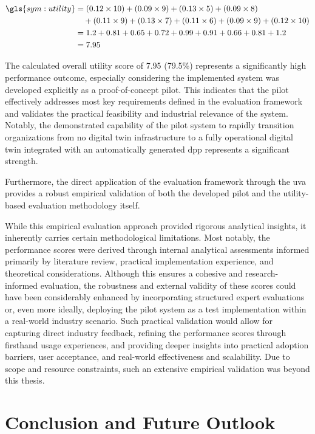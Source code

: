 \begin{align*}
\gls{sym:utility} 
&= (0.12 \times 10) + (0.09 \times 9) + (0.13 \times 5) + (0.09 \times 8) \\
&\quad + (0.11 \times 9) + (0.13 \times 7) + (0.11 \times 6) + (0.09 \times 9) + (0.12 \times 10) \\
&= 1.2 + 0.81 + 0.65 + 0.72 + 0.99 + 0.91 + 0.66 + 0.81 + 1.2 \\
&= 7.95
\end{align*}

The calculated overall utility score of 7.95 (79.5\%) represents a significantly high performance outcome, especially considering the implemented system was developed explicitly as a proof-of-concept pilot. This indicates that the pilot effectively addresses most key requirements defined in the evaluation framework and validates the practical feasibility and industrial relevance of the system. Notably, the demonstrated capability of the pilot system to rapidly transition organizations from no digital twin infrastructure to a fully operational digital twin integrated with an automatically generated \ac{dpp} represents a significant strength.

Furthermore, the direct application of the evaluation framework through the \ac{uva} provides a robust empirical validation of both the developed pilot and the utility-based evaluation methodology itself.

While this empirical evaluation approach provided rigorous analytical insights, it inherently carries certain methodological limitations. Most notably, the performance scores were derived through internal analytical assessments informed primarily by literature review, practical implementation experience, and theoretical considerations. Although this ensures a cohesive and research-informed evaluation, the robustness and external validity of these scores could have been considerably enhanced by incorporating structured expert evaluations or, even more ideally, deploying the pilot system as a test implementation within a real-world industry scenario. Such practical validation would allow for capturing direct industry feedback, refining the performance scores through firsthand usage experiences, and providing deeper insights into practical adoption barriers, user acceptance, and real-world effectiveness and scalability. Due to scope and resource constraints, such an extensive empirical validation was beyond this thesis.

\section{Conclusion and Future Outlook}

